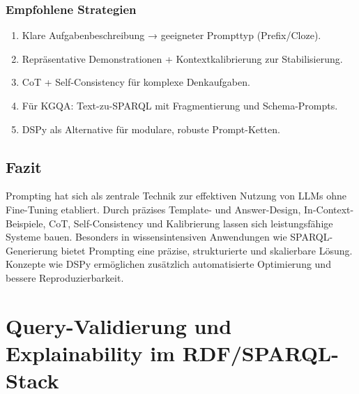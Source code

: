 \subsubsection*{Empfohlene Strategien}
\begin{enumerate}
  \item Klare Aufgabenbeschreibung → geeigneter Prompttyp (Prefix/Cloze).
  \item Repräsentative Demonstrationen + Kontextkalibrierung zur Stabilisierung.
  \item CoT + Self-Consistency für komplexe Denkaufgaben.
  \item Für KGQA: Text-zu-SPARQL mit Fragmentierung und Schema-Prompts.
  \item DSPy als Alternative für modulare, robuste Prompt-Ketten.
\end{enumerate}

\subsection{Fazit}

Prompting hat sich als zentrale Technik zur effektiven Nutzung von LLMs ohne Fine-Tuning etabliert. Durch präzises Template- und Answer-Design, In-Context-Beispiele, CoT, Self-Consistency und Kalibrierung lassen sich leistungsfähige Systeme bauen. Besonders in wissensintensiven Anwendungen wie SPARQL-Generierung bietet Prompting eine präzise, strukturierte und skalierbare Lösung. Konzepte wie DSPy ermöglichen zusätzlich automatisierte Optimierung und bessere Reproduzierbarkeit.











\section{Query-Validierung und Explainability im RDF/SPARQL-Stack}
\label{chap:Query-validation-explainability}

